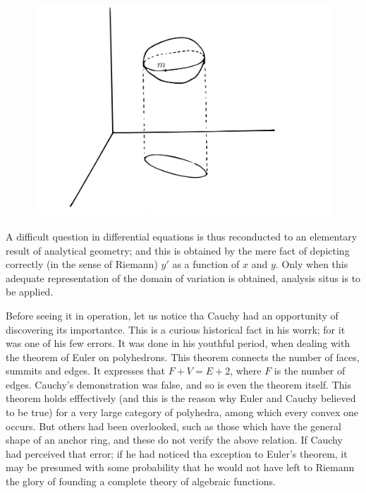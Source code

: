 \documentclass[12pt,oneside]{book}
\begin{document}
\begin{figure}
    \centering
    \includegraphics[height=8cm]{Fig6.jpeg}
    \label{Fig6}
\end{figure}

A difficult question in differential equations is thus reconducted to an elementary result of analytical geometry; and this is obtained by the mere fact of depicting correctly (in the sense of Riemann) $y'$ as a function of $x$ and $y$. Only when this adequate representation of the domain of variation is obtained, analysis situs is to be applied. \par

Before seeing it in operation, let us notice tha Cauchy had an opportunity of discovering its importantce. This is a curious historical fact in his worrk; for it was one of his few errors. It was done in his youthful period, when dealing with the theorem of Euler on polyhedrons. This theorem connects the number of faces, summits and edges. It expresses that $F+V=E+2$, where $F$ is the number of edges. Cauchy's demonstration was false, and so is even the theorem itself. This theorem holds efffectively (and this is the reason why Euler and Cauchy believed to be true) for a very large category of polyhedra, among which every convex one occurs. But others had been overlooked, such as those which have the general shape of an anchor ring, and these do not verify the above relation. If Cauchy had perceived that error; if he had noticed tha exception to Euler's theorem, it may be presumed with some probability that he would not have left to Riemann the glory of founding a complete theory of algebraic functions. \par
\end{document}
